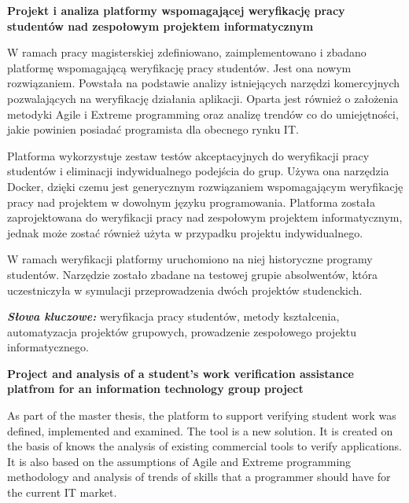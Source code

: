 \newpage
\vspace{10cm}

\newpage
\begin{center}
	\textbf{Projekt i analiza platformy wspomagającej weryfikację pracy studentów
nad zespołowym projektem informatycznym}
\end{center}
 \newline

W ramach pracy magisterskiej zdefiniowano, zaimplementowano i zbadano platformę wspomagającą weryfikację pracy studentów.
Jest ona nowym rozwiązaniem.
Powstała na podstawie analizy istniejących narzędzi komercyjnych pozwalających na weryfikację działania aplikacji.
Oparta jest również o założenia metodyki Agile i Extreme programming oraz analizę trendów co do umiejętności, jakie powinien posiadać programista dla obecnego rynku IT.

Platforma wykorzystuje zestaw testów akceptacyjnych do weryfikacji pracy studentów i eliminacji indywidualnego podejścia do grup.
Używa ona narzędzia Docker, dzięki czemu jest generycznym rozwiązaniem wspomagającym weryfikację pracy nad projektem w dowolnym języku programowania.
Platforma została zaprojektowana do weryfikacji pracy nad zespołowym projektem informatycznym, jednak może zostać również użyta w przypadku projektu indywidualnego.

W ramach weryfikacji platformy uruchomiono na niej historyczne programy studentów.
Narzędzie zostało zbadane na testowej grupie absolwentów, która uczestniczyła w symulacji przeprowadzenia dwóch projektów studenckich. \newline



\textit{\textbf{Słowa kluczowe:}} weryfikacja pracy studentów, metody kształcenia, automatyzacja projektów grupowych, prowadzenie zespołowego projektu informatycznego.

	\vspace{1cm}

\vfill
\pagebreak

\begin{center}
    \textbf{Project and analysis of a student's work verification assistance platfrom for an information technology group project}
\end{center}
 \newline

As part of the master thesis, the platform to support verifying student work was defined, implemented and examined.
The tool is a new solution.
It is created on the basis of knows the analysis of existing commercial tools to verify applications.
It is also based on the assumptions of Agile and Extreme programming methodology and analysis of trends of skills that a programmer should have for the current IT market.

